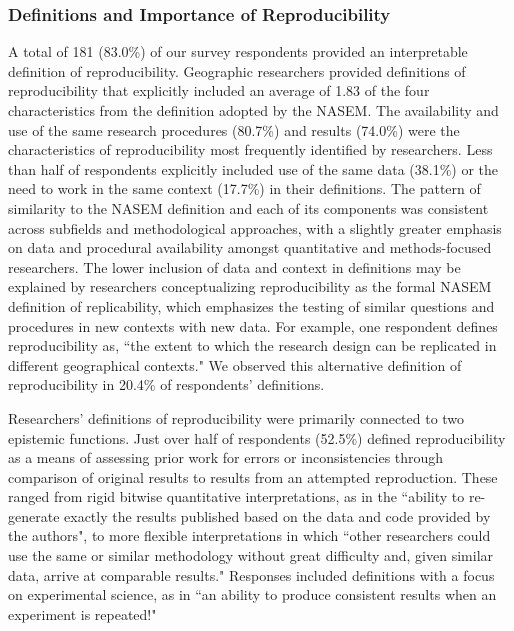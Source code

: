 \documentclass[]{interact}
\theoremstyle{plain}%
\theoremstyle{definition}
\theoremstyle{remark}
\begin{document}
\subsubsection*{Definitions and Importance of Reproducibility}
A total of 181 (83.0\%) of our survey respondents provided an interpretable definition of reproducibility.  
Geographic researchers provided definitions of reproducibility that explicitly included an average of 1.83 of the four characteristics from the definition adopted by the NASEM.
The availability and use of the same research procedures (80.7\%) and results (74.0\%) were the characteristics of reproducibility most frequently identified by researchers. 
Less than half of respondents explicitly included use of the same data (38.1\%) or the need to work in the same context (17.7\%) in their definitions. 
The pattern of similarity to the NASEM definition and each of its components was consistent across subfields and methodological approaches, with a slightly greater emphasis on data and procedural availability amongst quantitative and methods-focused researchers.
The lower inclusion of data and context in definitions may be explained by researchers conceptualizing reproducibility as the formal NASEM definition of replicability, which emphasizes the testing of similar questions and procedures in new contexts with new data. 
For example, one respondent defines reproducibility as, ``the extent to which the research design can be replicated in different geographical contexts."
We observed this alternative definition of reproducibility in 20.4\% of respondents' definitions.

Researchers' definitions of reproducibility were primarily connected to two epistemic functions.
Just over half of respondents (52.5\%) defined reproducibility as a means of assessing prior work for errors or inconsistencies through comparison of original results to results from an attempted reproduction.
These ranged from rigid bitwise quantitative interpretations, as in the ``ability to re-generate exactly the results published based on the data and code provided by the authors", to more flexible interpretations in which ``other researchers could use the same or similar methodology without great difficulty and, given similar data, arrive at comparable results."
Responses included definitions with a focus on experimental science, as in ``an ability to produce consistent results when an experiment is repeated!"
\end{document}
